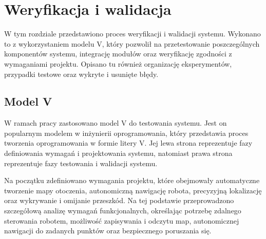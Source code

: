 \documentclass[a4paper,twoside,12pt]{book}
\begin{document}


%      

%      




\chapter{Weryfikacja i walidacja}
W tym rozdziale przedstawiono proces weryfikacji i walidacji systemu. Wykonano to z wykorzystaniem modelu V, który pozwolił na przetestowanie poszczególnych komponentów systemu, integrację modułów oraz weryfikację zgodności z wymaganiami projektu. Opisano tu również organizację eksperymentów, przypadki testowe oraz wykryte i usunięte błędy.

\section{Model V}
W ramach pracy zastosowano model V do testowania systemu. Jest on popularnym modelem w inżynierii oprogramowania, który przedstawia proces tworzenia oprogramowania w formie litery V. Jej lewa strona reprezentuje fazy definiowania wymagań i projektowania systemu, natomiast prawa strona reprezentuje fazy testowania i walidacji systemu. 


 Na początku zdefiniowano wymagania projektu, które obejmowały automatyczne tworzenie mapy otoczenia, autonomiczną nawigację robota, precyzyjną lokalizację oraz wykrywanie i omijanie przeszkód.
  Na tej podstawie przeprowadzono szczegółową analizę wymagań funkcjonalnych, określając potrzebę zdalnego sterowania robotem, możliwość zapisywania i odczytu map, autonomicznej nawigacji do zadanych punktów oraz bezpiecznego poruszania się.
\end{document}
